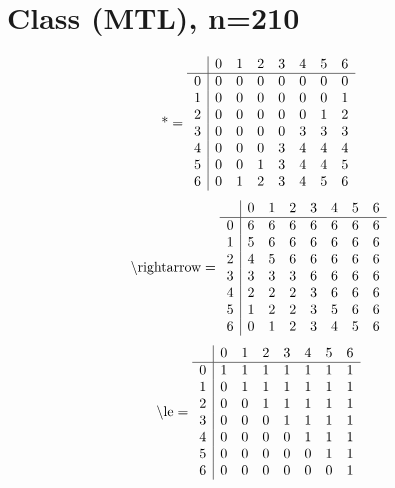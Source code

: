 \documentclass[11pt]{article}
\begin{document}
\section{Class (MTL), n=210}
\[\text{*} = 
\begin{array}{r | r r r r r r r}
 & 0 & 1 & 2 & 3 & 4 & 5 & 6 \\ \hline
0 & 0 & 0 & 0 & 0 & 0 & 0 & 0 \\
1 & 0 & 0 & 0 & 0 & 0 & 0 & 1 \\
2 & 0 & 0 & 0 & 0 & 0 & 1 & 2 \\
3 & 0 & 0 & 0 & 0 & 3 & 3 & 3 \\
4 & 0 & 0 & 0 & 3 & 4 & 4 & 4 \\
5 & 0 & 0 & 1 & 3 & 4 & 4 & 5 \\
6 & 0 & 1 & 2 & 3 & 4 & 5 & 6 \\
\end{array}
\]
\[\text{\textbackslash rightarrow} = 
\begin{array}{r | r r r r r r r}
 & 0 & 1 & 2 & 3 & 4 & 5 & 6 \\ \hline
0 & 6 & 6 & 6 & 6 & 6 & 6 & 6 \\
1 & 5 & 6 & 6 & 6 & 6 & 6 & 6 \\
2 & 4 & 5 & 6 & 6 & 6 & 6 & 6 \\
3 & 3 & 3 & 3 & 6 & 6 & 6 & 6 \\
4 & 2 & 2 & 2 & 3 & 6 & 6 & 6 \\
5 & 1 & 2 & 2 & 3 & 5 & 6 & 6 \\
6 & 0 & 1 & 2 & 3 & 4 & 5 & 6 \\
\end{array}
\]
\[\text{\textbackslash le} = 
\begin{array}{r | r r r r r r r}
 & 0 & 1 & 2 & 3 & 4 & 5 & 6 \\ \hline
0 & 1 & 1 & 1 & 1 & 1 & 1 & 1 \\
1 & 0 & 1 & 1 & 1 & 1 & 1 & 1 \\
2 & 0 & 0 & 1 & 1 & 1 & 1 & 1 \\
3 & 0 & 0 & 0 & 1 & 1 & 1 & 1 \\
4 & 0 & 0 & 0 & 0 & 1 & 1 & 1 \\
5 & 0 & 0 & 0 & 0 & 0 & 1 & 1 \\
6 & 0 & 0 & 0 & 0 & 0 & 0 & 1 \\
\end{array}
\]
\end{document}

